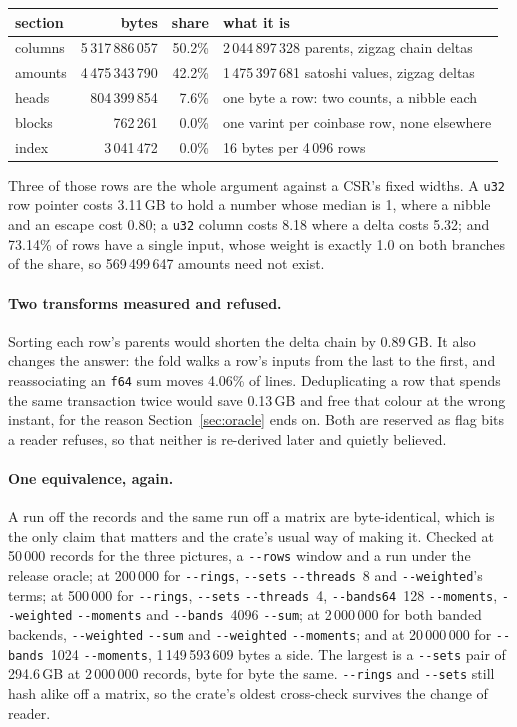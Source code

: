 \documentclass[11pt,a4paper]{article}
\newcommand{\flag}[1]{\texttt{-{}-#1}}
\begin{document}
\begin{center}
\begin{tabular}{lrrl}
\toprule
section & bytes & share & what it is \\
\midrule
columns & 5\,317\,886\,057 & 50.2\% & 2\,044\,897\,328 parents, zigzag chain deltas \\
amounts & 4\,475\,343\,790 & 42.2\% & 1\,475\,397\,681 satoshi values, zigzag deltas \\
heads   &   804\,399\,854 &  7.6\% & one byte a row: two counts, a nibble each \\
blocks  &       762\,261 &  0.0\% & one varint per coinbase row, none elsewhere \\
index   &     3\,041\,472 &  0.0\% & 16 bytes per 4\,096 rows \\
\bottomrule
\end{tabular}
\end{center}

Three of those rows are the whole argument against a CSR's fixed widths. A
\texttt{u32} row pointer costs 3.11\,GB to hold a number whose median is 1, where
a nibble and an escape cost 0.80; a \texttt{u32} column costs 8.18 where a delta
costs 5.32; and 73.14\% of rows have a single input, whose weight is exactly 1.0
on both branches of the share, so 569\,499\,647 amounts need not exist.

\paragraph{Two transforms measured and refused.} Sorting each row's parents would
shorten the delta chain by 0.89\,GB. It also changes the answer: the fold walks a
row's inputs from the last to the first, and reassociating an \texttt{f64} sum
moves 4.06\% of lines. Deduplicating a row that spends the same transaction twice
would save 0.13\,GB and free that colour at the wrong instant, for the reason
Section~\ref{sec:oracle} ends on. Both are reserved as flag bits a reader
refuses, so that neither is re-derived later and quietly believed.

\paragraph{One equivalence, again.} A run off the records and the same run off a
matrix are byte-identical, which is the only claim that matters and the crate's
usual way of making it. Checked at 50\,000 records for the three
pictures, a \flag{rows} window and a run under the release oracle; at 200\,000
for \flag{rings}, \flag{sets} \flag{threads}~8 and \flag{weighted}'s terms; at
500\,000 for \flag{rings}, \flag{sets} \flag{threads}~4, \flag{bands64}~128
\flag{moments}, \flag{weighted} \flag{moments} and \flag{bands}~4096
\flag{sum}; at 2\,000\,000 for both banded backends, \flag{weighted} \flag{sum}
and \flag{weighted} \flag{moments}; and at 20\,000\,000 for \flag{bands}~1024
\flag{moments}, 1\,149\,593\,609 bytes a side. The largest is a \flag{sets} pair
of 294.6\,GB at 2\,000\,000 records, byte for byte the same. \flag{rings} and
\flag{sets} still hash alike off a matrix, so the crate's oldest cross-check
survives the change of reader.
\end{document}
